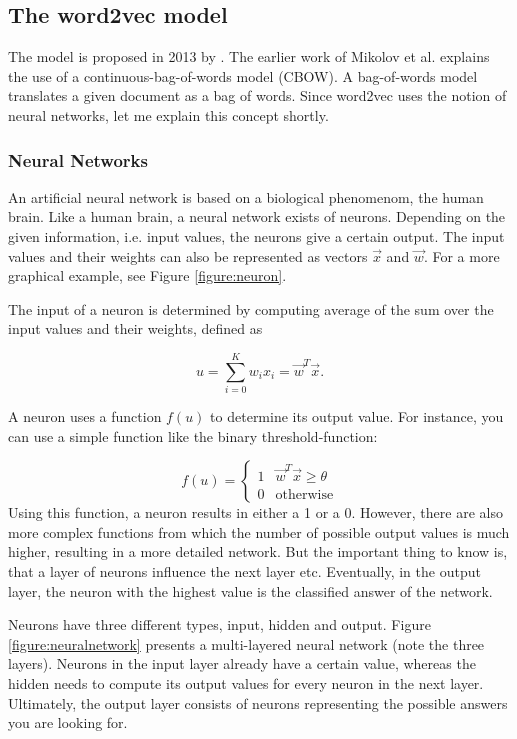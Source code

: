 \documentclass[a4paper,11pt]{article}
\begin{document}
\subsection{The word2vec model}
\label{section:word2vec}
The model is proposed in 2013 by \cite{Mikolov2013a,Mikolov2013b}. The earlier work of Mikolov et al. \cite{Mikolov2013a} explains the use of a continuous-bag-of-words model (CBOW). A bag-of-words model translates a given document as a bag of words. Since word2vec uses the notion of neural networks, let me explain this concept shortly. 

\subsubsection{Neural Networks}
An artificial neural network is based on a biological phenomenom, the human brain. Like a human brain, a neural network exists of neurons. Depending on the given information, i.e. input values, the neurons give a certain output. The input values and their weights can also be represented as vectors $\vec{x}$ and $\vec{w}$. For a more graphical example, see Figure \ref{figure:neuron}.

The input of a neuron is determined by computing average of the sum over the input values and their weights, defined as 

\begin{equation}
u = \sum_{i=0}^{K}w_i x_i = \vec{w}^T \vec{x}.
\end{equation}

A neuron uses a function $f(u)$ to determine its output value. For instance, you can use a simple function like the binary threshold-function:

\begin{equation}
f(u) = \begin{cases}
1 & \vec{w}^T \vec{x} \geq \theta \\
0 & \text{otherwise}
\end{cases}
\end{equation}
Using this function, a neuron results in either a 1 or a 0. However, there are also more complex functions from which the number of possible output values is much higher, resulting in a more detailed network. But the important thing to know is, that a layer of neurons influence the next layer etc. Eventually, in the output layer, the neuron with the highest value is the classified answer of the network.

Neurons have three different types, input, hidden and output. Figure \ref{figure:neuralnetwork} presents a multi-layered neural network (note the three layers). Neurons in the input layer already have a certain value, whereas the hidden needs to compute its output values for every neuron in the next layer. Ultimately, the output layer consists of neurons representing the possible answers you are looking for. 
\end{document}
